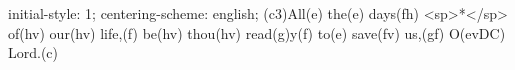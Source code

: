 initial-style: 1;
centering-scheme: english;
(c3)All(e) the(e) days(fh) <sp>*</sp> of(hv) our(hv) life,(f) be(hv) thou(hv) read(g)y(f) to(e) save(fv) us,(gf) O(evDC) Lord.(c)

